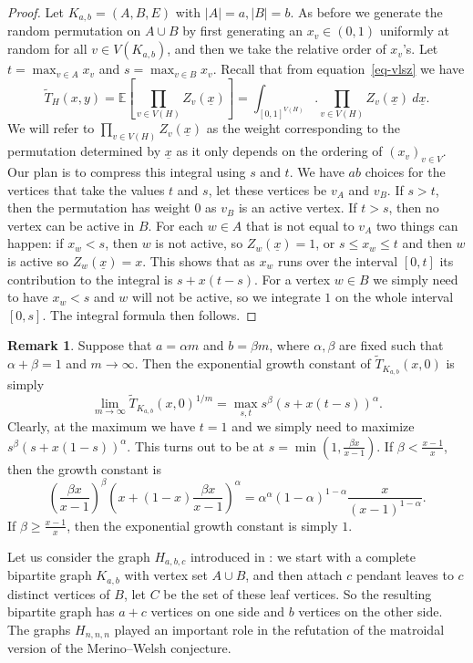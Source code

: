 \documentclass[12pt,a4paper]{amsart}
\numberwithin{equation}{section}
\theoremstyle{plain}
\theoremstyle{definition}
\newtheorem{Rem}[Th]{Remark}
\newcommand{\1}{\textbf{1}}
\newcommand{\wT}{\widetilde{T}}
\begin{document}
\begin{proof}
Let $K_{a,b}=(A,B,E)$ with $|A|=a,|B|=b$. As before we generate the random permutation on $A\cup B$ by first generating an $x_v\in (0,1)$ uniformly at random for all $v\in V(K_{a,b})$, and then we take the relative order of $x_v$'s. Let $t=\max_{v\in A}x_v$ and $s=\max_{v\in B}x_v$. Recall that from equation~\ref{eq-vlsz} we have
\begin{equation*} 
\wT_H(x,y)=\mathbb{E}\left[\prod_{v\in V(H)}Z_v(\underline{x})\right]=\int_{[0,1]^{V(H)}}.\prod_{v\in V(H)}Z_v(\underline{x})\ d\underline{x}.
\end{equation*}
We will refer to $\prod_{v\in V(H)}Z_v(\underline{x})$ as the weight corresponding to the permutation determined by $\underline{x}$ as it only depends on the ordering of $(x_v)_{v\in V}$.
Our plan is to compress this integral using $s$ and $t$. We have $ab$ choices for the vertices that take the values $t$ and $s$, let these vertices be $v_A$ and $v_B$. If $s>t$, then the permutation has weight $0$ as $v_B$ is an active vertex. If $t>s$, then no vertex can be active in $B$. For each $w\in A$ that is not equal to $v_A$ two things can happen: if $x_w<s$, then $w$ is not active, so $Z_w(\underline{x})=1$, or $s\leqslant x_w\leqslant t$ and then $w$ is active so $Z_w(\underline{x})=x$. This shows that as $x_w$ runs over the interval $[0,t]$ its contribution to the integral is $s+x(t-s)$. For a vertex $w\in B$ we simply need to have $x_w<s$ and $w$ will not be active, so we integrate $1$ on the whole interval $[0,s]$. The integral formula then follows.
\end{proof}

\begin{Rem} Suppose that $a=\alpha m$ and $b=\beta m$, where $\alpha,\beta$ are fixed such that $\alpha+\beta=1$ and $m\to \infty$. Then the exponential growth constant of $\wT_{K_{a,b}}(x,0)$ is simply
$$\lim_{m\to \infty}\wT_{K_{a,b}}(x,0)^{1/m}=\max_{s,t}s^{\beta}(s+x(t-s))^{\alpha}.$$
Clearly, at the maximum we have $t=1$ and we simply need to maximize $s^{\beta}(s+x(1-s))^{\alpha}$. 
This turns out to be at $s=\min\left(1,\frac{\beta x}{x-1}\right)$. 
If $\beta<\frac{x-1}{x}$, then the growth constant is
$$\left(\frac{\beta x}{x-1}\right)^{\beta}\left(x+(1-x)\frac{\beta x}{x-1}\right)^{\alpha}=\alpha^{\alpha}(1-\alpha)^{1-\alpha}\frac{x}{(x-1)^{1-\alpha}}.$$
If $\beta\geqslant\frac{x-1}{x}$, then the exponential growth constant is simply $1$. 
\end{Rem}

Let us consider the graph $H_{a,b,c}$ introduced in \cite{beke2024permutation}: we start with a complete bipartite graph $K_{a,b}$ with vertex set $A\cup B$, and then attach $c$ pendant leaves to $c$ distinct vertices of $B$, let $C$ be the set of these leaf vertices. So the resulting bipartite graph has $a+c$ vertices on one side and $b$ vertices on the other side. The graphs $H_{n,n,n}$ played an important role in the refutation of the matroidal version of the Merino--Welsh conjecture. 
\end{document}
